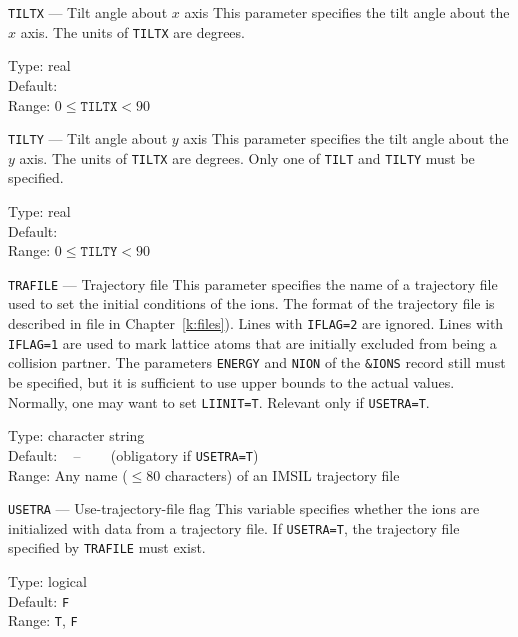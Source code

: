 \begin{keydescription}{\texttt{TILTX} --- Tilt angle about $x$ axis}
%
  This parameter specifies the tilt angle about the $x$ axis. The units of
  \texttt{TILTX} are degrees.
%
  \begin{keytab}
    Type:    \> real \\
    Default:  \\
    Range:   \> $0 \le \texttt{TILTX} < 90$
  \end{keytab}
\end{keydescription}

\begin{keydescription}{\texttt{TILTY} --- Tilt angle about $y$ axis}
%
  This parameter specifies the tilt angle about the $y$ axis. The units of
  \texttt{TILTX} are degrees. Only one of \texttt{TILT} and \texttt{TILTY} 
  must be specified.
%
  \begin{keytab}
    Type:    \> real \\
    Default:  \\
    Range:   \> $0 \le \texttt{TILTY} < 90$
  \end{keytab}
\end{keydescription}

\begin{keydescription}{\texttt{TRAFILE} --- Trajectory file}
%
  This parameter specifies the name of a trajectory file used to set the
  initial conditions of the ions. The format of the trajectory file
  is described in file in Chapter~\ref{k:files}). Lines with
  \texttt{IFLAG=2} are ignored. Lines with \texttt{IFLAG=1} are used to
  mark lattice atoms that are initially excluded from being a collision
  partner. The parameters \texttt{ENERGY} and \texttt{NION} of the
  \texttt{\&IONS} record still must be specified, but it is sufficient to use
  upper bounds to the actual values. Normally, one may want to set
  \texttt{LIINIT=T}. Relevant only if \texttt{USETRA=T}.
  \begin{keytab}
    Type:    \> character string \\
    Default: \> ~ -- ~~~ (obligatory if \texttt{USETRA=T}) \\
    Range:   \> Any name ($\le 80$ characters) of an IMSIL trajectory file
  \end{keytab}
\end{keydescription}

\begin{keydescription}{\texttt{USETRA} --- Use-trajectory-file flag}
%
  This variable specifies whether the ions are initialized with data from a
  trajectory file. If \texttt{USETRA=T}, the trajectory file specified by
  \texttt{TRAFILE} must exist.
%
  \begin{keytab}
    Type:    \> logical \\
    Default: \> \texttt{F} \\
    Range:   \> \texttt{T}, \texttt{F}
  \end{keytab}
\end{keydescription}

